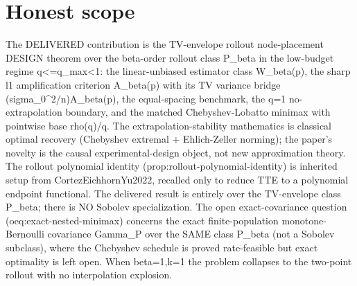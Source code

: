 \documentclass{article}
\begin{document}
\section{Honest scope}

The DELIVERED contribution is the TV-envelope rollout node-placement DESIGN theorem over the beta-order rollout class P_beta in the low-budget regime q<=q_max<1: the linear-unbiased estimator class W_beta(p), the sharp l1 amplification criterion A_beta(p) with its TV variance bridge (sigma_0^2/n)A_beta(p), the equal-spacing benchmark, the q=1 no-extrapolation boundary, and the matched Chebyshev-Lobatto minimax with pointwise base rho(q)/q. The extrapolation-stability mathematics is classical optimal recovery (Chebyshev extremal + Ehlich-Zeller norming); the paper's novelty is the causal experimental-design object, not new approximation theory. The rollout polynomial identity (prop:rollout-polynomial-identity) is inherited setup from CortezEichhornYu2022, recalled only to reduce TTE to a polynomial endpoint functional. The delivered result is entirely over the TV-envelope class P_beta; there is NO Sobolev specialization. The open exact-covariance question (oeq:exact-nested-minimax) concerns the exact finite-population monotone-Bernoulli covariance Gamma_P over the SAME class P_beta (not a Sobolev subclass), where the Chebyshev schedule is proved rate-feasible but exact optimality is left open. When beta=1,k=1 the problem collapses to the two-point rollout with no interpolation explosion.
\end{document}
